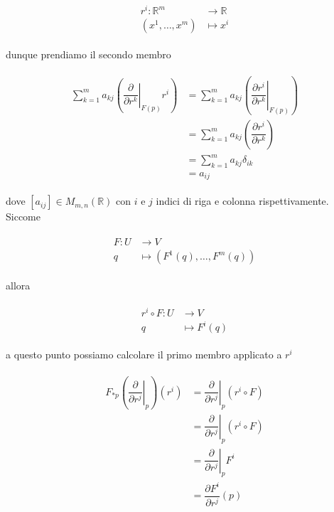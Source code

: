 \begin{align}
	\begin{split}
		r^{i} : \mathbb{R}^{m} &\to \mathbb{R}\\
		(x^{1},\dots,x^{m}) &\mapsto x^{i}
	\end{split}
\end{align}

dunque prendiamo il secondo membro

\begin{align}
	\begin{split}
		\sum_{k=1}^{m} a_{kj} \left( \left. \dfrac{\partial}{\partial r^{k}} \right|_{F(p)} r^{i} \right) &= \sum_{k=1}^{m} a_{kj} \left( \left. \dfrac{\partial r^{i}}{\partial r^{k}} \right|_{F(p)} \right)\\
		&= \sum_{k=1}^{m} a_{kj} \left( \dfrac{\partial r^{i}}{\partial r^{k}} \right)\\
		&= \sum_{k=1}^{m} a_{kj} \delta_{ik}\\
		&= a_{ij}
	\end{split}
\end{align}

dove $ [a_{ij}] \in M_{m,n}(\mathbb{R}) $ con $ i $ e $ j $ indici di riga e colonna rispettivamente. Siccome

\begin{align}
	\begin{split}
		F : U &\to V\\
		q &\mapsto (F^{1}(q),\dots,F^{m}(q))
	\end{split}
\end{align}

allora

\begin{align}
	\begin{split}
		r^{i} \circ F : U &\to V\\
		q &\mapsto F^{i}(q)
	\end{split}
\end{align}

a questo punto possiamo calcolare il primo membro applicato a $ r^{i} $

\begin{align}
	\begin{split}
		F_{*p} \left( \left. \dfrac{\partial}{\partial r^{j}} \right|_{p} \right) (r^{i}) &= \left. \dfrac{\partial}{\partial r^{j}} \right|_{p} (r^{i} \circ F)\\
		&= \left. \dfrac{\partial}{\partial r^{j}} \right|_{p} (r^{i} \circ F)\\
		&= \left. \dfrac{\partial}{\partial r^{j}} \right|_{p} F^{i}\\
		&= \dfrac{\partial F^{i}}{\partial r^{j}} (p)
	\end{split}
\end{align}

